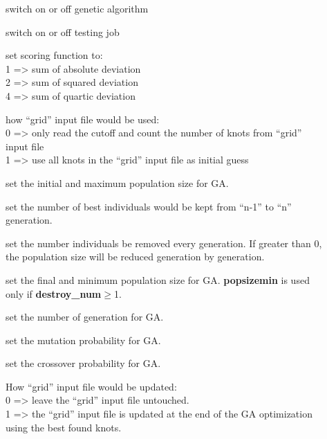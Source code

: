 \begin{description}
  \item[] switch on or off genetic algorithm
  \item[] switch on or off testing job
  \item[] set scoring function to:\\
       1 => sum of absolute deviation  \\
       2 => sum of squared  deviation  \\
       4 => sum of quartic  deviation\\
  \item[] how ``grid'' input file would be used:\\
       0 => only read the cutoff and count the number of knots from
                              ``grid'' input file\\
       1 => use all knots in the ``grid'' input file as initial guess\\
  \item[] set the initial and maximum population size for GA. 
  \item[] set the number of best individuals would be
                              kept from ``n-1'' to ``n'' generation.
  \item[] set the number individuals be removed every
                              generation. If greater than 0, the population size 
                              will be reduced generation by generation. 
  \item[] set the final and minimum population size for GA. 
                              \textbf{popsizemin} is used only if \textbf{destroy\_num}$\geq$1.
  \item[] set the number of generation for GA. 
  \item[] set the mutation probability for GA. 
  \item[] set the crossover probability for GA. 
  \item[] How ``grid'' input file would be updated:\\ 
       0 => leave the ``grid'' input file untouched.\\
       1 => the ``grid'' input file is updated at the end of the GA optimization 
                              using the best found knots.
\end{description}
